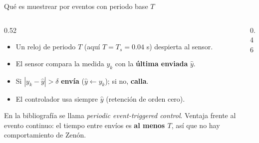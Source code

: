 \documentclass[aspectratio=169,11pt]{beamer}
\begin{document}
\begin{frame}{Qué es muestrear por eventos con periodo base $T$}
  \small
  \begin{columns}[T]
  \begin{column}{0.52\textwidth}
    \begin{itemize}
      \item Un reloj de periodo $T$ (aquí $T=T_s=0.04$ s) despierta al sensor.
      \item El sensor compara la medida $y_k$ con la \textbf{última enviada} $\hat y$.
      \item Si $|y_k-\hat y|>\delta$ \textbf{envía} ($\hat y\leftarrow y_k$); si no, \textbf{calla}.
      \item El controlador usa siempre $\hat y$ (retención de orden cero).
    \end{itemize}
    \vspace{2pt}
    En la bibliografía se llama \emph{periodic event-triggered control}. Ventaja frente al evento continuo: el tiempo entre envíos es \textbf{al menos $T$}, así que no hay comportamiento de Zenón.
  \end{column}
  \begin{column}{0.46\textwidth}
    \centering
  \end{column}
  \end{columns}
\end{frame}
\end{document}
